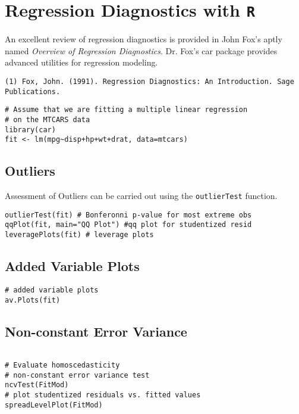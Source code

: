 \documentclass[main.tex]{subfiles}
\begin{document}
\newpage
\section{Regression Diagnostics with \texttt{R} }

An excellent review of regression diagnostics is provided in John Fox's aptly named \textit{Overview of Regression Diagnostics}. Dr. Fox's car package provides advanced utilities for regression modeling.

\begin{verbatim}
(1) Fox, John. (1991). Regression Diagnostics: An Introduction. Sage Publications.
\end{verbatim}

\begin{framed}
\begin{verbatim}
# Assume that we are fitting a multiple linear regression
# on the MTCARS data
library(car)
fit <- lm(mpg~disp+hp+wt+drat, data=mtcars)

\end{verbatim}
\end{framed}


\subsection{Outliers}

Assessment of Outliers can be carried out using the \texttt{outlierTest} function.

\begin{framed}
\begin{verbatim}
outlierTest(fit) # Bonferonni p-value for most extreme obs
qqPlot(fit, main="QQ Plot") #qq plot for studentized resid 
leveragePlots(fit) # leverage plots
\end{verbatim}
\end{framed}
\subsection{Added Variable Plots}
\begin{framed}
\begin{verbatim}
# added variable plots 
av.Plots(fit)
\end{verbatim}
\end{framed}

\subsection{Non-constant Error Variance}
\begin{framed}
\begin{verbatim}

# Evaluate homoscedasticity
# non-constant error variance test
ncvTest(FitMod)
# plot studentized residuals vs. fitted values 
spreadLevelPlot(FitMod)
\end{verbatim}
\end{framed}
\end{document}

